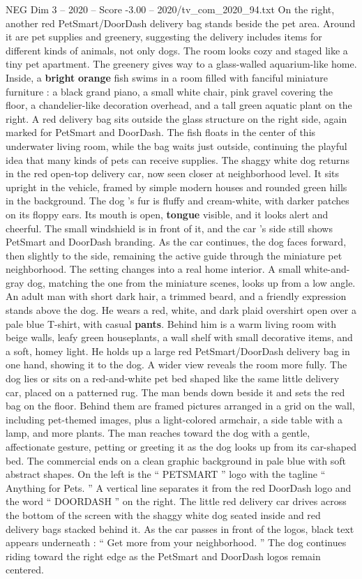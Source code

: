 \begin{textsample}{NEG Dim 3 – 2020 – Score -3.00 – 2020/tv\_com\_2020\_94.txt}
On the right, another red PetSmart/DoorDash delivery bag stands beside the pet area.
Around it are pet supplies and greenery, suggesting the delivery includes items for different kinds of animals, not only dogs.
The room looks cozy and staged like a tiny pet apartment.
The greenery gives way to a glass-walled aquarium-like home.
Inside, a \textbf{bright} \textbf{orange} fish swims in a room filled with fanciful miniature furniture : a black grand piano, a small white chair, pink gravel covering the floor, a chandelier-like decoration overhead, and a tall green aquatic plant on the right.
A red delivery bag sits outside the glass structure on the right side, again marked for PetSmart and DoorDash.
The fish floats in the center of this underwater living room, while the bag waits just outside, continuing the playful idea that many kinds of pets can receive supplies.
The shaggy white dog returns in the red open-top delivery car, now seen closer at neighborhood level.
It sits upright in the vehicle, framed by simple modern houses and rounded green hills in the background.
The dog ’s fur is fluffy and cream-white, with darker patches on its floppy ears.
Its mouth is open, \textbf{tongue} visible, and it looks alert and cheerful.
The small windshield is in front of it, and the car ’s side still shows PetSmart and DoorDash branding.
As the car continues, the dog faces forward, then slightly to the side, remaining the active guide through the miniature pet neighborhood.
The setting changes into a real home interior.
A small white-and-gray dog, matching the one from the miniature scenes, looks up from a low angle.
An adult man with short dark hair, a trimmed beard, and a friendly expression stands above the dog.
He wears a red, white, and dark plaid overshirt open over a pale blue T-shirt, with casual \textbf{pants}.
Behind him is a warm living room with beige walls, leafy green houseplants, a wall shelf with small decorative items, and a soft, homey light.
He holds up a large red PetSmart/DoorDash delivery bag in one hand, showing it to the dog.
A wider view reveals the room more fully.
The dog lies or sits on a red-and-white pet bed shaped like the same little delivery car, placed on a patterned rug.
The man bends down beside it and sets the red bag on the floor.
Behind them are framed pictures arranged in a grid on the wall, including pet-themed images, plus a light-colored armchair, a side table with a lamp, and more plants.
The man reaches toward the dog with a gentle, affectionate gesture, petting or greeting it as the dog looks up from its car-shaped bed.
The commercial ends on a clean graphic background in pale blue with soft abstract shapes.
On the left is the “ PETSMART ” logo with the tagline “ Anything for Pets. ” A vertical line separates it from the red DoorDash logo and the word “ DOORDASH ” on the right.
The little red delivery car drives across the bottom of the screen with the shaggy white dog seated inside and red delivery bags stacked behind it.
As the car passes in front of the logos, black text appears underneath : “ Get more from your neighborhood. ” The dog continues riding toward the right edge as the PetSmart and DoorDash logos remain centered.

\end{textsample}
